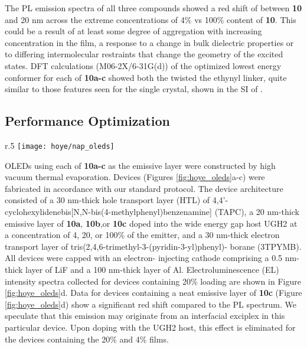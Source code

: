 \documentclass[../thesis.tex]{subfiles}
\begin{document}
The PL emission spectra of all three compounds showed a red shift of between \textbf{10} and 20 nm across the extreme concentrations of 4\% vs 100\% content of \textbf{10}. 
This could be a result of at least some degree of aggregation with increasing concentration in the film, a response to a change in bulk dielectric properties or to differing intermolecular restraints that change the geometry of the excited states. 
DFT calculations (M06-2X/6-31G(d)) of the optimized lowest energy conformer for each of \textbf{10a-c} showed both the twisted the ethynyl linker, quite similar to those features seen for the single crystal, shown in the SI of \textcite{Xu2016}. 

\subsection{Performance Optimization}

\begin{wrapfigure}{r}{.5\textwidth}
\centering
\texttt{[image: hoye/nap\_oleds]}
\caption{(a) OLED architecture. (b)  EL spectra for \textbf{10a}. (c) EL spectra for \textbf{10b}. (d) EL spectra for \textbf{10c}.  Figure reproduced from \textcite{Xu2016}}
\label{fig:hoye_oleds}
\end{wrapfigure}

OLEDs using each of \textbf{10a-c} as the emissive layer were constructed by high vacuum thermal evaporation. 
Devices (Figures \ref{fig:hoye_oleds}a-c) were fabricated in accordance with our standard protocol.
The device architecture consisted of a 30 nm-thick hole transport layer (HTL) of 4,4'- cyclohexylidenebis[N,N-bis(4-methylphenyl)benzenamine] (TAPC), a 20 nm-thick emissive layer of \textbf{10a}, \textbf{10b},or \textbf{10c} doped into the wide energy gap host UGH2 at a concentration of 4, 20, or 100\% of the emitter, and a 30 nm-thick electron transport layer of tris(2,4,6-trimethyl-3-(pyridin-3-yl)phenyl)- borane (3TPYMB). 
All devices were capped with an electron- injecting cathode comprising a 0.5 nm-thick layer of LiF and a 100 nm-thick layer of Al. 
Electroluminescence (EL) intensity spectra collected for devices containing 20\% loading are shown in Figure \ref{fig:hoye_oleds}d. 
Data for devices containing a neat emissive layer of \textbf{10c} (Figure \ref{fig:hoye_oleds}d) show a significant red shift compared to the PL spectrum. 
We speculate that this emission may originate from an interfacial exciplex in this particular device. 
Upon doping with the UGH2 host, this effect is eliminated for the devices containing the 20\% and 4\% films. 
\end{document}
